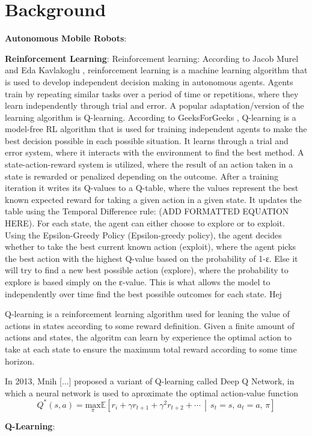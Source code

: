 \section{Background}

\textbf{Autonomous Mobile Robots}:


\textbf{Reinforcement Learning}:
Reinforcement learning: According to Jacob Murel and Eda Kavlakoglu \cite{JacobMurel1RL}, reinforcement learning is a machine learning
algorithm that is used to develop independent decision making in autonomous agents.
Agents train by repeating similar tasks over a period of time or repetitions, where they
learn independently through trial and error. A popular adaptation/version of the learning
algorithm is Q-learning. According to GeeksForGeeks \cite{GeeksForGeeks1RL}, Q-learning is a model-free RL
algorithm that is used for training independent agents to make the best decision
possible in each possible situation. It learns through a trial and error system, where it
interacts with the environment to find the best method. A state-action-reward system is
utilized, where the result of an action taken in a state is rewarded or penalized
depending on the outcome. After a training iteration it writes its Q-values to a Q-table,
where the values represent the best known expected reward for taking a given action in
a given state. It updates the table using the Temporal Difference rule:
(ADD FORMATTED EQUATION HERE). For each state, the agent can either choose to
explore or to exploit. Using the Epsilon-Greedy Policy (Epsilon-greedy policy), the agent
decides whether to take the best current known action (exploit), where the agent picks
the best action with the highest Q-value based on the probability of 1-ε. Else it will try to
find a new best possible action (explore), where the probability to explore is based
simply on the ε-value. This is what allows the model to independently over time find the
best possible outcomes for each state. Hej


Q-learning is a reinforcement learning algorithm used for leaning the value of actions in states according to some reward definition. Given a finite amount of actions and states, the algoritm can learn by experience the optimal action to take at each state to ensure the maximum total reward according to some time horizon.

In 2013, Mnih [...] proposed a variant of Q-learning called Deep Q Network, in which a neural network is used to aproximate the optimal action-value function
\begin{equation}
    Q^*(s,a)=\underset \pi {\text{max}} \mathbb{E}\left[ r_i+\gamma r_{t+1}+\gamma^2 r_{t+2}+\cdots \,\middle|\, s_t=s,\,a_t=a,\,\pi \right]
\end{equation}



\textbf{Q-Learning}: